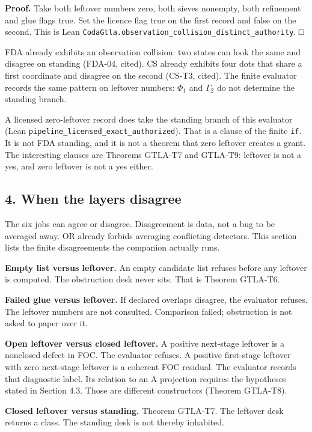 \documentclass[
  11pt,
]{article}
\begin{document}
\textbf{Proof.} Take both leftover numbers zero, both sieves nonempty, both refinement and glue flags true. Set the licence flag true on the first record and false on the second. This is Lean \nolinkurl{CodaGtla.observation_collision_distinct_authority}. □

FDA already exhibits an observation collision: two states can look the same and disagree on standing (FDA-04, cited). CS already exhibits four dots that share a first coordinate and disagree on the second (CS-T3, cited). The finite evaluator records the same pattern on leftover numbers: \(\Phi_1\) and \(\Gamma_2\) do not determine the standing branch.

A licensed zero-leftover record does take the standing branch of this evaluator (Lean \nolinkurl{pipeline_licensed_exact_authorized}). That is a clause of the finite \texttt{if}. It is not FDA standing, and it is not a theorem that zero leftover creates a grant. The interesting clauses are Theorems GTLA-T7 and GTLA-T9: leftover is not a yes, and zero leftover is not a yes either.

\subsection{4. When the layers disagree}\label{when-the-layers-disagree}

The six jobs can agree or disagree. Disagreement is data, not a bug to be averaged away. OR already forbids averaging conflicting detectors. This section lists the finite disagreements the companion actually runs.

\textbf{Empty list versus leftover.} An empty candidate list refuses before any leftover is computed. The obstruction desk never sits. That is Theorem GTLA-T6.

\textbf{Failed glue versus leftover.} If declared overlaps disagree, the evaluator refuses. The leftover numbers are not consulted. Comparison failed; obstruction is not asked to paper over it.

\textbf{Open leftover versus closed leftover.} A positive next-stage leftover is a nonclosed defect in FOC. The evaluator refuses. A positive first-stage leftover with zero next-stage leftover is a coherent FOC residual. The evaluator records that diagnostic label. Its relation to an A projection requires the hypotheses stated in Section 4.3. Those are different constructors (Theorem GTLA-T8).

\textbf{Closed leftover versus standing.} Theorem GTLA-T7. The leftover desk returns a class. The standing desk is not thereby inhabited.
\end{document}
